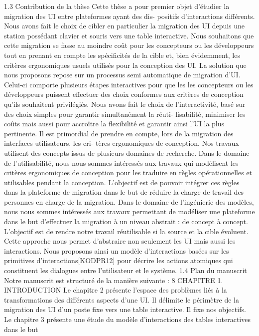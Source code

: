 \documentclass{article}
\begin{document}
1.3
Contribution de la thèse
Cette thèse a pour premier objet d’étudier la migration des UI entre plateformes ayant des dis-
positifs d’interactions différents. Nous avons fait le choix de cibler en particulier la migration des
UI depuis une station possédant clavier et souris vers une table interactive. Nous souhaitons que
cette migration se fasse au moindre coût pour les concepteurs ou les développeurs tout en prenant en
compte les spéciﬁcités de la cible et, bien évidemment, les critères ergonomiques usuels utilisés pour
la conception des UI.
La solution que nous proposons repose sur un processus semi automatique de migration d’UI.
Celui-ci comporte plusieurs étapes interactives pour que les les concepteurs ou les développeurs
puissent effectuer des choix conformes aux critères de conception qu’ils souhaitent privilégiés. Nous
avons fait le choix de l’interactivité, basé sur des choix simples pour garantir simultanément la réuti-
lisabilité, minimiser les coûts mais aussi pour accroître la ﬂexibilité et garantir ainsi l’UI la plus
pertinente.
Il est primordial de prendre en compte, lors de la migration des interfaces utilisateurs, les cri-
tères ergonomiques de conception. Nos travaux utilisent des concepts issus de plusieurs domaines de
recherche.
Dans le domaine de l’utilisabilité, nous nous sommes intéressés aux travaux qui modélisent les
critères ergonomiques de conception pour les traduire en règles opérationnelles et utilisables pendant
la conception. L’objectif est de pouvoir intégrer ces règles dans la plateforme de migration dans le but
de réduire la charge de travail des personnes en charge de la migration.
Dans le domaine de l’ingénierie des modèles, nous nous sommes intéressés aux travaux permettant
de modéliser une plateforme dans le but d’effectuer la migration à un niveau abstrait : de concept
à concept. L’objectif est de rendre notre travail réutilisable si la source et la cible évoluent. Cette
approche nous permet d’abstraire non seulement les UI mais aussi les interactions. Nous proposons
ainsi un modèle d’interactions basées sur les primitives d’interactions[KODPR12] pour décrire les
actions atomiques qui constituent les dialogues entre l’utilisateur et le système.
1.4
Plan du manuscrit
Notre manuscrit est structuré de la manière suivante :
8
CHAPITRE 1. INTRODUCTION
Le chapitre 2 présente l’espace des problèmes liés à la transformations des différents aspects d’une
UI. Il délimite le périmètre de la migration des UI d’un poste ﬁxe vers une table interactive. Il ﬁxe nos
objectifs.
Le chapitre 3 présente une étude du modèle d’interactions des tables interactives dans le but
\end{document}
